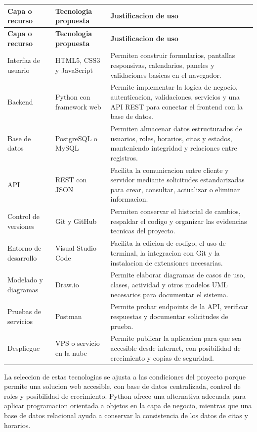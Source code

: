 \documentclass[12pt,letterpaper]{article}
\begin{document}
\begin{longtable}{|p{3.2cm}|p{4cm}|p{7.5cm}|}
\hline
\textbf{Capa o recurso} & \textbf{Tecnologia propuesta} & \textbf{Justificacion de uso} \\
\hline
\endfirsthead
\hline
\textbf{Capa o recurso} & \textbf{Tecnologia propuesta} & \textbf{Justificacion de uso} \\
\hline
\endhead
\hline
\endfoot
\hline
\endlastfoot

Interfaz de usuario & HTML5, CSS3 y JavaScript & Permiten construir formularios, pantallas responsivas, calendarios, paneles y validaciones basicas en el navegador. \\
\hline
Backend & Python con framework web & Permite implementar la logica de negocio, autenticacion, validaciones, servicios y una API REST para conectar el frontend con la base de datos. \\
\hline
Base de datos & PostgreSQL o MySQL & Permiten almacenar datos estructurados de usuarios, roles, horarios, citas y estados, manteniendo integridad y relaciones entre registros. \\
\hline
API & REST con JSON & Facilita la comunicacion entre cliente y servidor mediante solicitudes estandarizadas para crear, consultar, actualizar o eliminar informacion. \\
\hline
Control de versiones & Git y GitHub & Permiten conservar el historial de cambios, respaldar el codigo y organizar las evidencias tecnicas del proyecto. \\
\hline
Entorno de desarrollo & Visual Studio Code & Facilita la edicion de codigo, el uso de terminal, la integracion con Git y la instalacion de extensiones necesarias. \\
\hline
Modelado y diagramas & Draw.io & Permite elaborar diagramas de casos de uso, clases, actividad y otros modelos UML necesarios para documentar el sistema. \\
\hline
Pruebas de servicios & Postman & Permite probar endpoints de la API, verificar respuestas y documentar solicitudes de prueba. \\
\hline
Despliegue & VPS o servicio en la nube & Permite publicar la aplicacion para que sea accesible desde internet, con posibilidad de crecimiento y copias de seguridad. \\
\hline
\end{longtable}

La seleccion de estas tecnologias se ajusta a las condiciones del proyecto porque permite una solucion web accesible, con base de datos centralizada, control de roles y posibilidad de crecimiento. Python ofrece una alternativa adecuada para aplicar programacion orientada a objetos en la capa de negocio, mientras que una base de datos relacional ayuda a conservar la consistencia de los datos de citas y horarios.
\end{document}
